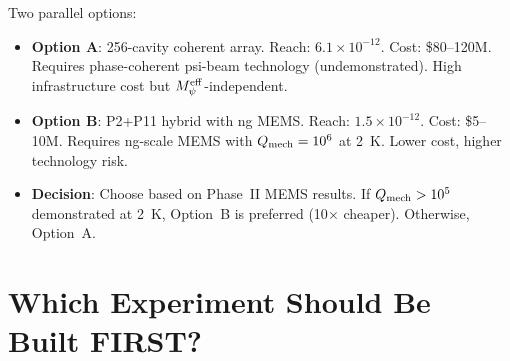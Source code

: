 \documentclass[11pt]{article}
\theoremstyle{definition}
\theoremstyle{remark}
\newcommand{\ee}[1]{\times 10^{#1}}
\newcommand{\Meff}{M_\psi^{\rm eff}}
\begin{document}
\begin{tcolorbox}[colback=blue!5!white, colframe=blue!60!black,
  title=\textbf{DEFINITIVE DFD DETECTION ROADMAP}]
Two parallel options:
\begin{itemize}[nosep]
\item \textbf{Option A}: 256-cavity coherent array. Reach: $6.1\ee{-12}$.
  Cost: \$80--120M. Requires phase-coherent psi-beam technology (undemonstrated).
  High infrastructure cost but $\Meff$-independent.
\item \textbf{Option B}: P2+P11 hybrid with ng MEMS. Reach: $1.5\ee{-12}$.
  Cost: \$5--10M. Requires ng-scale MEMS with $Q_{\rm mech} = 10^6$ at 2~K.
  Lower cost, higher technology risk.
\item \textbf{Decision}: Choose based on Phase~II MEMS results. If
  $Q_{\rm mech} > 10^5$ demonstrated at 2~K, Option~B is preferred
  (10$\times$ cheaper). Otherwise, Option~A.
\end{itemize}
\end{tcolorbox}

\section{Which Experiment Should Be Built FIRST?}
\label{sec:first_experiment}
\end{document}
